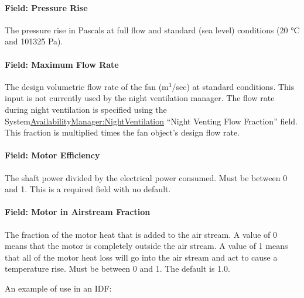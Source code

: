 \paragraph{Field: Pressure Rise}\label{field-pressure-rise-4}

The pressure rise in Pascals at full flow and standard (sea level) conditions (20 °C and 101325 Pa).

\paragraph{Field: Maximum Flow Rate}\label{field-maximum-flow-rate-4}

The design volumetric flow rate of the fan (m\(^{3}\)/sec) at standard conditions. This input is not currently used by the night ventilation manager. The flow rate during night ventilation is specified using the System\hyperref[availabilitymanagernightventilation]{AvailabilityManager:NightVentilation} ``Night Venting Flow Fraction'' field. This fraction is multiplied times the fan object's design flow rate.

\paragraph{Field: Motor Efficiency}\label{field-motor-efficiency-3}

The shaft power divided by the electrical power consumed. Must be between 0 and 1. This is a required field with no default.

\paragraph{Field: Motor in Airstream Fraction}\label{field-motor-in-airstream-fraction-3}

The fraction of the motor heat that is added to the air stream. A value of 0 means that the motor is completely outside the air stream. A value of 1 means that all of the motor heat loss will go into the air stream and act to cause a temperature rise. Must be between 0 and 1. The default is 1.0.

An example of use in an IDF:

